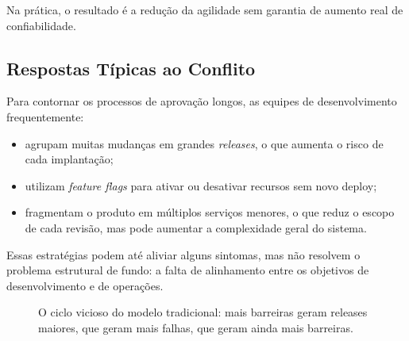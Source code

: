 \documentclass[12pt,a4paper]{report}
\begin{document}
Na prática, o resultado é a redução da agilidade sem garantia de aumento
real de confiabilidade.

\subsection{Respostas Típicas ao Conflito}

Para contornar os processos de aprovação longos, as equipes de desenvolvimento
frequentemente:
\begin{itemize}[nosep]
    \item agrupam muitas mudanças em grandes \emph{releases}, o que aumenta o
    risco de cada implantação;
    \item utilizam \emph{feature flags} para ativar ou desativar recursos sem
    novo deploy;
    \item fragmentam o produto em múltiplos serviços menores, o que reduz o
    escopo de cada revisão, mas pode aumentar a complexidade geral do sistema.
\end{itemize}

Essas estratégias podem até aliviar alguns sintomas, mas não resolvem o
problema estrutural de fundo: a falta de alinhamento entre os objetivos de
desenvolvimento e de operações.

\begin{figure}[h]
    \centering
    \caption{O ciclo vicioso do modelo tradicional: mais barreiras geram releases maiores, que geram mais falhas, que geram ainda mais barreiras.}
\end{figure}
\end{document}
